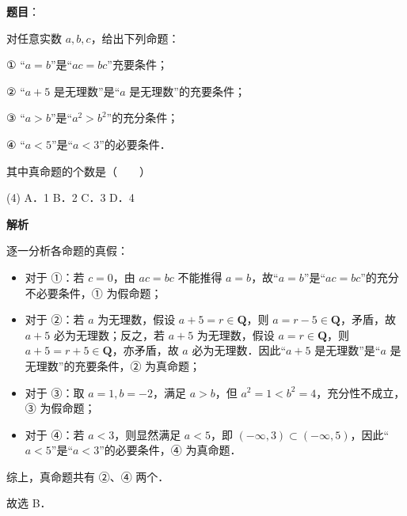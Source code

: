 \begin{answer}

\textbf{题目}：

对任意实数 $a, b, c$，给出下列命题：

① “$a = b$”是“$ac = bc$”充要条件；

② “$a + 5$ 是无理数”是“$a$ 是无理数”的充要条件；

③ “$a > b$”是“$a^2 > b^2$”的充分条件；

④ “$a < 5$”是“$a < 3$”的必要条件．

其中真命题的个数是\mbox{（　　）}

\begin{gkopts}(4)
\task A．1
\task B．2
\task C．3
\task D．4
\end{gkopts}

\textbf{解析}

逐一分析各命题的真假：
\begin{itemize}
\item 对于 ①：若 $c = 0$，由 $ac = bc$ 不能推得 $a = b$，故“$a = b$”是“$ac = bc$”的充分不必要条件，① 为假命题；
\item 对于 ②：若 $a$ 为无理数，假设 $a + 5 = r \in \mathbf{Q}$，则 $a = r - 5 \in \mathbf{Q}$，矛盾，故 $a + 5$ 必为无理数；反之，若 $a + 5$ 为无理数，假设 $a = r \in \mathbf{Q}$，则 $a + 5 = r + 5 \in \mathbf{Q}$，亦矛盾，故 $a$ 必为无理数．因此“$a + 5$ 是无理数”是“$a$ 是无理数”的充要条件，② 为真命题；
\item 对于 ③：取 $a = 1, b = -2$，满足 $a > b$，但 $a^2 = 1 < b^2 = 4$，充分性不成立，③ 为假命题；
\item 对于 ④：若 $a < 3$，则显然满足 $a < 5$，即 $(-\infty, 3) \subset (-\infty, 5)$，因此“$a < 5$”是“$a < 3$”的必要条件，④ 为真命题．
\end{itemize}

综上，真命题共有 ②、④ 两个．

故选 B．


\end{answer}
